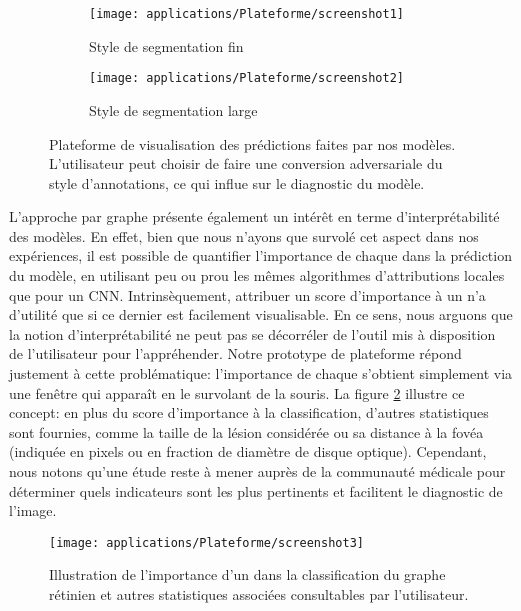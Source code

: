 \begin{figure}[!htb]
	\centering
	\begin{subfigure}{\textwidth}
		\texttt{[image: applications/Plateforme/screenshot1]}
		\caption{Style de segmentation fin}
	\end{subfigure}
	\begin{subfigure}{\textwidth}

		\texttt{[image: applications/Plateforme/screenshot2]}
		\caption{Style de segmentation large}
	\end{subfigure}
\caption{Plateforme de visualisation des prédictions faites par nos modèles. L'utilisateur peut choisir de faire une conversion adversariale du style d'annotations, ce qui influe sur le diagnostic du modèle.}
\label{fig:plateformeOutilsAlgo}
\end{figure}
L'approche par graphe présente également un intérêt en terme d'interprétabilité des modèles. En effet, bien que nous n'ayons que survolé cet aspect dans nos expériences, il est possible de quantifier l'importance de chaque \noeud{} dans la prédiction du modèle, en utilisant peu ou prou les mêmes algorithmes d'attributions locales que pour un CNN. Intrinsèquement, attribuer un score d'importance à un \noeud{} n'a d'utilité que si ce dernier est facilement visualisable. En ce sens, nous arguons que la notion d'interprétabilité ne peut pas se décorréler de l'outil mis à disposition de l'utilisateur pour l'appréhender. Notre prototype de plateforme répond justement à cette problématique: l'importance de chaque \noeud{} s'obtient simplement via une fenêtre qui apparaît en le survolant de la souris. La figure \ref{fig:ImportanceNoeudPlateforme} illustre ce concept: en plus du score d'importance à la classification, d'autres statistiques sont fournies, comme la taille de la lésion considérée ou sa distance à la fovéa (indiquée en pixels ou en fraction de diamètre de disque optique). Cependant, nous notons qu'une étude reste à mener auprès de la communauté médicale pour déterminer quels indicateurs sont les plus pertinents et facilitent le diagnostic de l'image. 
\begin{figure}[!h]
	\centering
	\texttt{[image: applications/Plateforme/screenshot3]}
	\caption{Illustration de l'importance d'un \noeud{} dans la classification du graphe rétinien et autres statistiques associées consultables par l'utilisateur.}
	\label{fig:ImportanceNoeudPlateforme}
\end{figure}
